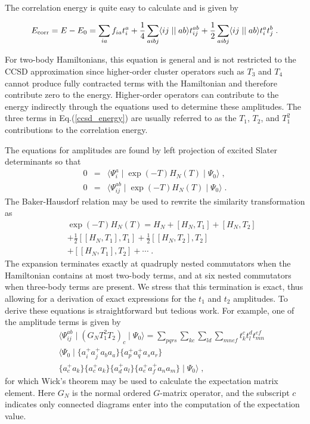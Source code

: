 \documentclass[aps,prc,twocolumn,floatfix]{revtex4}
\begin{document}
The correlation energy is quite easy to calculate and is given by
\begin{widetext}
\begin{equation}
E_{\rm corr}=E-E_0 = \sum_{ia}f_{ia}t^a_i
+\frac{1}{4}\sum_{aibj}\langle ij \mid\mid ab \rangle t^{ab}_{ij}
+\frac{1}{2}\sum_{aibj}\langle ij \mid\mid ab \rangle t^a_i t^b_j \;.
\label{ccsd_energy}
\end{equation}
\end{widetext}
For two-body Hamiltonians, this equation is general and is not 
restricted to the CCSD approximation since higher-order cluster
operators such as $T_3$ and $T_4$ cannot produce fully contracted
terms with the Hamiltonian and therefore contribute zero to the 
energy. Higher-order operators can contribute to the energy 
indirectly through the equations used to determine these 
amplitudes. The three terms in Eq.(\ref{ccsd_energy}) are 
usually referred to as the $T_1$, $T_2$, and $T_1^2$ contributions
to the correlation energy. 

The equations for amplitudes are found by left projection of 
excited Slater determinants
so that 
\begin{eqnarray}
0 &=& \langle\Psi_i^a\mid 
\exp\left(-T\right) H_N \left(T\right) \mid \Psi_0\rangle\;,  \\
0 &=& 
\langle\Psi_{ij}^{ab}\mid 
\exp\left(-T\right) H_N \left(T\right) \mid \Psi_0\rangle \;.
\end{eqnarray}
The Baker-Hausdorf 
relation may be used to rewrite the similarity
transformation as 
\begin{eqnarray}
& & \exp\left(-T\right) H_N \left(T\right)=
H_N+\left[H_N,T_1\right]+\left[H_N,T_2\right] \nonumber \\
& &+\frac{1}{2}\left[\left[H_N,T_1\right],T_1\right] 
+\frac{1}{2}\left[\left[H_N,T_2\right],T_2\right] \nonumber \\
& &+\left[\left[H_N,T_1\right],T_2\right]+\cdots \;.
\end{eqnarray}
The expansion terminates exactly at quadruply nested commutators  when
the Hamiltonian contains at most two-body terms, and at six
nested commutators when  three-body terms are present. We stress that
this termination is exact, thus allowing for a derivation of exact
expressions for the $t_1$ and $t_2$ amplitudes. To derive these equations
is straightforward but tedious work.  For example, one of the amplitude
terms is given by
\begin{eqnarray}
 & & \langle\Psi^{ab}_{ij}\mid \left(G_N T_1^2 T_2 \right)_c\mid \Psi_0\rangle
=\sum_{pqrs}\sum_{kc}\sum_{ld}\sum_{mnef} 
t^c_k t^d_l t^{ef}_{mn} \nonumber \\
& &
\langle\Psi_0\mid \{a^+_i a^+_j a_b a_a\}\{a^+_p a^+_q a_s a_r\} \nonumber \\
& & \{a^+_c a_k\}
\{a^+_c a_k\}\{a^+_d a_l\}\{a^+_e a^+_f a_n a_m\}\mid\Psi_0\rangle  \;,
\end{eqnarray}
for which Wick's theorem may be used to calculate the expectation 
matrix element.  Here $G_N$ is the normal ordered $G$-matrix operator, and the 
subscript $c$ indicates only connected diagrams enter into the computation
of the expectation value. 
\end{document}
